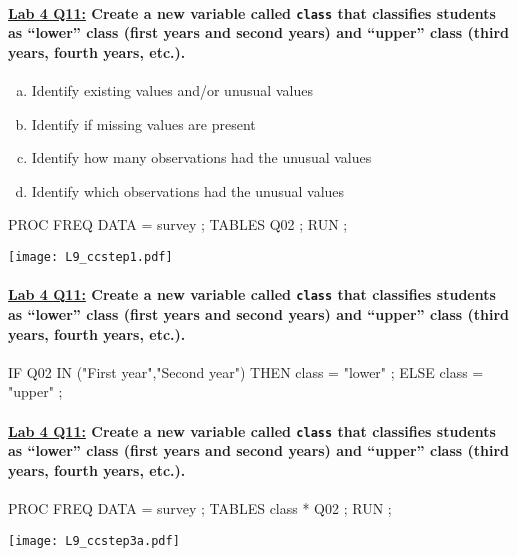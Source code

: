 \begin{frame}[fragile]
\framesubtitle{\underline{Lab 4 Q11:} Create a new variable called \texttt{class} that classifies students as ``lower'' class (first years and second years) and ``upper'' class (third years, fourth years, etc.).}
\begin{enumerate}[a.]
\item Identify existing values and/or unusual values
\item Identify if missing values are present
\item Identify how many observations had the unusual values
\item Identify which observations had the unusual values
\end{enumerate}
\vskip10pt
\footnotesize
\begin{code}{.0}
PROC FREQ DATA = survey ;
   TABLES Q02 ;
RUN ;
\end{code}
\emp
{} \hspace{1in} \emp
{}
\texttt{[image: L9\_ccstep1.pdf]}
\emp
\end{frame}


\begin{frame}[fragile]
\framesubtitle{\underline{Lab 4 Q11:} Create a new variable called \texttt{class} that classifies students as ``lower'' class (first years and second years) and ``upper'' class (third years, fourth years, etc.).}
\footnotesize
\begin{code}{.0}
IF Q02 IN ("First year","Second year") THEN class  = "lower" ;
ELSE class = "upper" ;
\end{code}
\emp
\end{frame}

\begin{frame}[fragile]
\framesubtitle{\underline{Lab 4 Q11:} Create a new variable called \texttt{class} that classifies students as ``lower'' class (first years and second years) and ``upper'' class (third years, fourth years, etc.).}
\footnotesize
\begin{code}{.0}
PROC FREQ DATA = survey ;
   TABLES class * Q02 ;
RUN ;
\end{code}
\emp
{} \hspace{1in} \emp
{}
\texttt{[image: L9\_ccstep3a.pdf]}
\emp
\end{frame}

